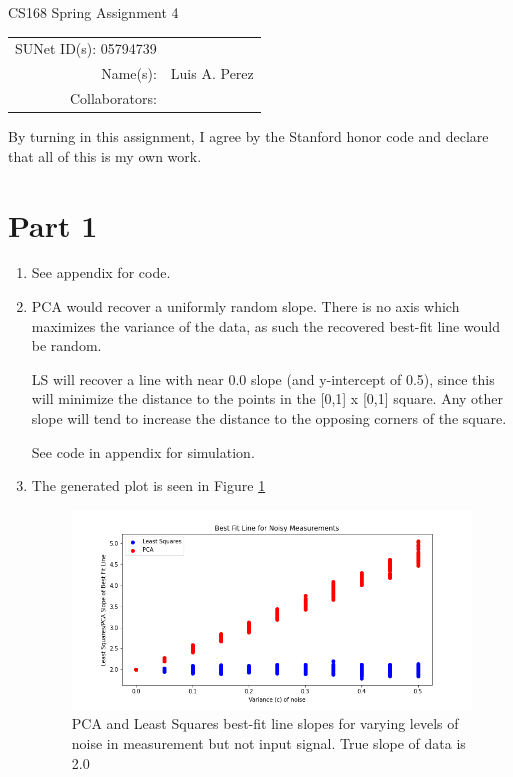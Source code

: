 \documentclass[12pt]{article}
\begin{document}
\begin{center}
{\Large CS168 Spring Assignment 4}

\begin{tabular}{rl}
SUNet ID(s): 05794739 & \\
Name(s): & Luis A. Perez \\
Collaborators: &
\end{tabular}
\end{center}

By turning in this assignment, I agree by the Stanford honor code and declare
that all of this is my own work.

\section*{Part 1}

\begin{enumerate}[label=(\alph*)]
  \item See appendix for code.
  \item
    PCA would recover a uniformly random slope. There is no axis which maximizes the variance of the data, as such the recovered best-fit line would be random.

    LS will recover a line with near 0.0 slope (and y-intercept of 0.5), since this will minimize the distance to the points in the [0,1] x [0,1] square. Any other slope will tend to increase the distance to the opposing corners of the square.

    See code in appendix for simulation.

  \item
    The generated plot is seen in Figure \ref{fig:problem1c}
    \begin{figure}[!ht]
      \centering
      \includegraphics[scale=0.5]{figures/problem1c.png}
      \caption{PCA and Least Squares best-fit line slopes for varying levels of noise in measurement but not input signal. True slope of data is 2.0}
      \label{fig:problem1c}
    \end{figure}


\end{enumerate}
\end{document}
